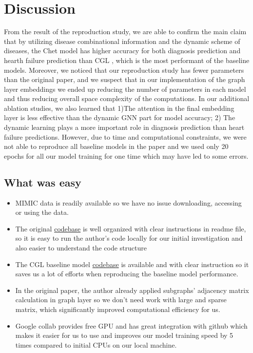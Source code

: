 \documentclass[11pt,a4paper,fleqn]{article}
\begin{document}
\section{Discussion}
From the result of the reproduction study, we are able to confirm the main claim that by utilizing disease combinational information and the dynamic scheme of diseases, the Chet model has higher accuracy for both diagnosis prediction and
hearth failure prediction than CGL \cite{cgl}, which is the most performant
of the baseline models. Moreover, we noticed that our reproduction study has fewer parameters than the original paper, and we suspect that in our implementation of the graph layer embeddings we ended up reducing the number of parameters in each model and thus reducing overall space complexity of the computations. 
In our additional ablation studies, we also learned that 1)The attention in the final embedding layer is less effective than the dynamic GNN part for model accuracy; 2) The dynamic learning plays a more important role in diagnosis prediction than heart failure predictions.
However, due to time and computational constraints, we were not able to reproduce all baseline models in the paper and we used only 20 epochs for all our model 
training for one time which may have led to some errors.


\subsection{What was easy}
\begin{itemize}
    \item MIMIC data is readily available so we have no issue downloading, accessing or using the data.
    \item The original \href{https://github.com/LuChang-CS/Chet}{codebase} is well organized with clear instructions in readme file, so it is easy to run the author's code locally for our initial investigation and also easier to understand the code structure
    \item The CGL baseline model \href{https://github.com/LuChang-CS/CGL}{codebase} is available and with clear instruction so it saves us a lot of efforts when reproducing the baseline model performance.
    \item In the original paper, the author already applied subgraphs’ adjacency matrix calculation in graph layer so we don't need work with large and sparse matrix, which significantly improved computational efficiency for us.
    \item Google collab provides free GPU and has great integration with github which makes it easier for us to use and improves our model training speed by 5 times compared to initial CPUs on our local machine.
\end{itemize}
\end{document}

